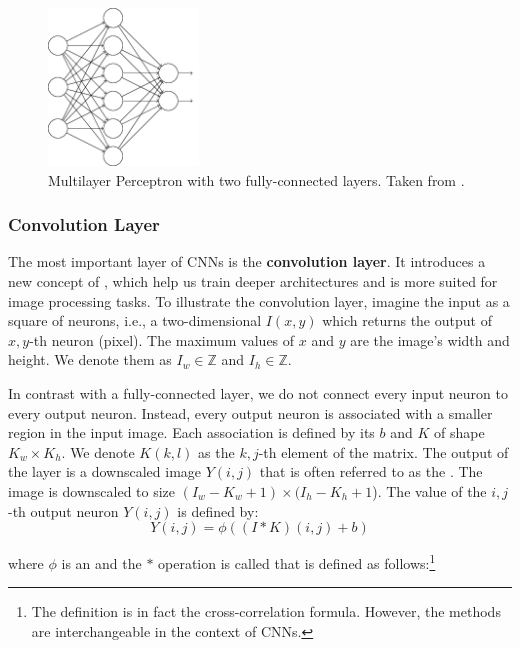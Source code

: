 \begin{figure}[h]
    \centering
    \includegraphics[width=4cm]{Sources/Figures/fully_connected_layer.png}
    \caption{Multilayer Perceptron with two fully-connected layers. Taken from
        \cite{nielsenneural}.}
    \label{fig:fcl}
\end{figure}

\subsubsection{Convolution Layer}

The most important layer of CNNs is the \textbf{convolution layer}. It
introduces a new concept of , which help us train deeper
architectures and is more suited for image processing tasks. To illustrate the
convolution layer, imagine the input as a square of neurons, i.e., a
two-dimensional  $I(x,y)$ which returns the output of $x,y$-th neuron
(pixel). The maximum values of $x$ and $y$ are the image's width and height.
We denote them as $I_w \in \mathds{Z}$ and $I_h \in \mathds{Z}$.


In contrast with a fully-connected layer, we do not connect every input neuron
to every output neuron. Instead, every output neuron is associated with a
smaller region in the input image. Each association is defined by its
 $b$ and  $K$ of shape $K_w \times K_h$.
We denote $K(k, l)$ as the $k,j$-th element of the matrix. The output of the layer
is a downscaled image $Y(i,j)$ that is often referred to as the .
The image is downscaled to size $(I_w - K_w + 1) \times (I_h - K_h + 1$).
    The value of the $i, j$-th output neuron $Y(i,j)$ is defined by:
    $$
        Y(i, j) = \phi\left((I * K)(i,j) + b\right)
    $$

    where $\phi$ is an  and the $*$ operation is called 
    that is defined as follows:\footnote{The definition is in fact the cross-correlation formula.
        However, the methods are interchangeable in the context of CNNs.}

